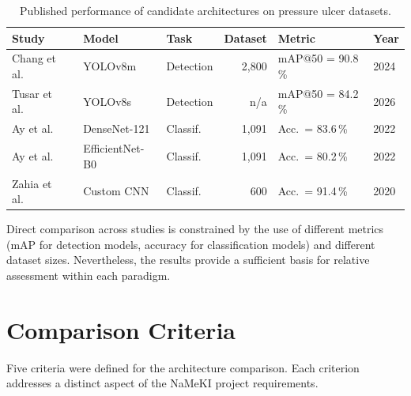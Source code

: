 \documentclass[a4paper,12pt,twoside]{report}
\begin{document}
\begin{table}[htbp]
  \centering
  \caption{Published performance of candidate architectures on pressure ulcer
    datasets.}
  \label{tab:lit-performance}
  \small
  \begin{tabularx}{\textwidth}{llXrll}
    \toprule
    \textbf{Study} & \textbf{Model} & \textbf{Task} &
      \textbf{Dataset} & \textbf{Metric} & \textbf{Year} \\
    \midrule
    Chang et al.\ \citep{chang2024diagnosis}
      & YOLOv8m & Detection & 2{,}800 & mAP@50 = 90.8\,\% & 2024 \\
    Tusar et al.\ \citep{tusar2026ai}
      & YOLOv8s & Detection & n/a & mAP@50 = 84.2\,\% & 2026 \\
    Ay et al.\ \citep{ay2022deep}
      & DenseNet-121 & Classif. & 1{,}091 & Acc.\ = 83.6\,\% & 2022 \\
    Ay et al.\ \citep{ay2022deep}
      & EfficientNet-B0 & Classif. & 1{,}091 & Acc.\ = 80.2\,\% & 2022 \\
    Zahia et al.\ \citep{zahia2018tissue}
      & Custom CNN & Classif. & 600 & Acc.\ = 91.4\,\% & 2020 \\
    \bottomrule
  \end{tabularx}
\end{table}

Direct comparison across studies is constrained by the use of different metrics
(mAP for detection models, accuracy for classification models) and different
dataset sizes. Nevertheless, the results provide a sufficient basis for relative
assessment within each paradigm.

\section{Comparison Criteria}
\label{sec:comparison-criteria}

Five criteria were defined for the architecture comparison. Each criterion
addresses a distinct aspect of the NaMeKI project requirements.
\end{document}
